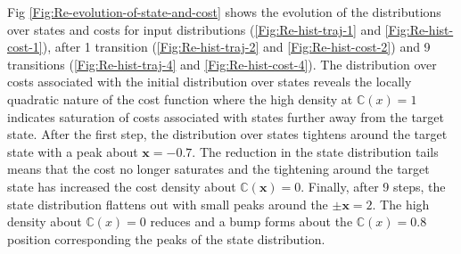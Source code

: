 Fig \ref{Fig:Re-evolution-of-state-and-cost} shows the evolution of the distributions over states and costs for input distributions (\ref{Fig:Re-hist-traj-1} and \ref{Fig:Re-hist-cost-1}), after 1 transition (\ref{Fig:Re-hist-traj-2} and \ref{Fig:Re-hist-cost-2}) and 9 transitions (\ref{Fig:Re-hist-traj-4} and \ref{Fig:Re-hist-cost-4}). The distribution over costs associated with the initial distribution over states reveals the locally quadratic nature of the cost function where the high density at $\mathbb{C}(x)=1$ indicates saturation of costs associated with states further away from the target state. After the first step, the distribution over states tightens around the target state with a peak about $\mathbf{x}=-0.7$. The reduction in the state distribution tails means that the cost no longer saturates and the tightening around the target state has increased the cost density about $\mathbb{C}(\mathbf{x})=0$. Finally, after 9 steps, the state distribution flattens out with small peaks around the $\pm\mathbf{x}=2$. The high density about $\mathbb{C}(x)=0$ reduces and a bump forms about the $\mathbb{C}(x)=0.8$ position corresponding the peaks of the state distribution. 
